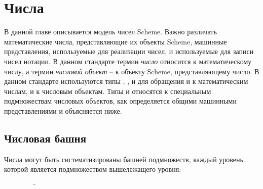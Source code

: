 \chapter{Числа}
\label{numbertypeschapter}

В данной главе описывается модель чисел Scheme. Важно различать математические числа,
представляющие их объекты Scheme, машинные представления, используемые для реализации чисел, и
используемые для записи чисел нотации. В данном стандарте термин \textit{число} относится к
математическому числу, а термин \textit{числовой объект} -- к объекту Scheme, представляющему
число. В данном стандарте используются типы , ,  и
 для обращения и к математическим числам, и к числовым объектам. Типы
 и  относятся к специальным подмножествам числовых объектов, как
определяется общими машинными представлениями и объясняется ниже.

\section{Числовая башня}
\label{numericaltypes}

Числа могут быть систематизированы башней подмножеств, каждый уровень которой является
подмножеством вышележащего уровня:
\begin{tabbing}
\ \ \ \ \ \ \ \ \ \= \\
\>  \\
\>  \\
\>  \\
\> 
\end{tabbing}


